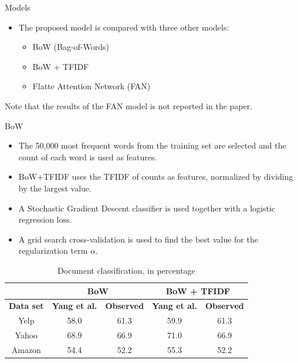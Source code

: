 \documentclass[10pt]{beamer}
\begin{document}
\begin{frame}{Models}

\begin{itemize}
\item
The proposed model is compared with three other models:
\begin{itemize}
\item BoW (Bag-of-Words)
\item BoW + TFIDF
\item Flatte Attention Network (FAN)
\end{itemize}
\end{itemize}

Note that the results of the FAN model is not reported in the paper.

\end{frame}


\begin{frame}{BoW}
\small{
\begin{itemize}
\item
The 50,000 most frequent words from the training set are selected and the count of each word is used as features.
\item
BoW+TFIDF uses the TFIDF of counts as features, normalized by dividing by the largest value.
\item
A Stochastic Gradient Descent classifier is used together with a logistic regression loss.
\item
A grid search cross-validation is used to find the best value for the regularization term $\alpha$.
\end{itemize}

\begin{table}[]
\begin{tabular}{c|c|c|c|c|}
\cline{2-5}
                       & \multicolumn{2}{c|}{\textbf{BoW}} & \multicolumn{2}{c|}{\textbf{BoW + TFIDF}} \\
\hline
\multicolumn{1}{|c|}{\textbf{Data set}} & \textbf{Yang et al. \cite{yang2016hierarchical}} &  \textbf{Observed} &  \textbf{Yang et al. \cite{yang2016hierarchical}} & \textbf{Observed} \\
\hline
\multicolumn{1}{|c|}{Yelp} & 58.0 & 61.3 & 59.9 & 61.3 \\
\hline
\multicolumn{1}{|c|}{Yahoo} & 68.9 & 66.9 & 71.0 & 66.9 \\
\hline
\multicolumn{1}{|c|}{Amazon} & 54.4 & 52.2 & 55.3 & 52.2 \\
\hline
\end{tabular}
\caption{\small{Document classification, in percentage}}
\end{table}
}
\end{frame}
\end{document}
